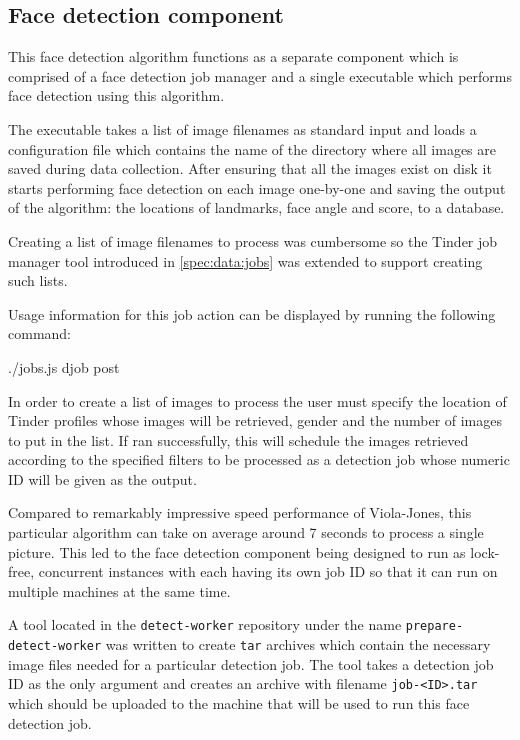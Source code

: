 \subsection{Face detection component}
This face detection algorithm functions as a separate component which is
comprised of a face detection job manager and a single executable which
performs face detection using this algorithm.

The executable takes a list of image filenames as standard input and loads a
configuration file which contains the name of the directory where all images
are saved during data collection. After ensuring that all the images exist on
disk it starts performing face detection on each image one-by-one and saving
the output of the algorithm: the locations of landmarks, face angle and score,
to a database.

Creating a list of image filenames to process was cumbersome so the Tinder job
manager tool introduced in \ref{spec:data:jobs} was extended to support
creating such lists. 

Usage information for this job action can be displayed by running the following
command:
\begin{logs}
./jobs.js djob post
\end{logs}

In order to create a list of images to process the user must specify the
location of Tinder profiles whose images will be retrieved, gender and the
number of images to put in the list. If ran successfully, this will schedule
the images retrieved according to the specified filters to be processed as a
detection job whose numeric ID will be given as the output.

Compared to remarkably impressive speed performance of Viola-Jones, this
particular algorithm can take on average around 7 seconds to process a single
picture. This led to the face detection component being designed to run as
lock-free, concurrent instances with each having its own job ID so that it can
run on multiple machines at the same time.

A tool located in the \texttt{detect-worker} repository under the name
\texttt{prepare-detect-worker} was written to create \texttt{tar} archives
which contain the necessary image files needed for a particular detection job.
The tool takes a detection job ID as the only argument and creates an archive
with filename \texttt{job-<ID>.tar} which should be uploaded to the machine
that will be used to run this face detection job.

